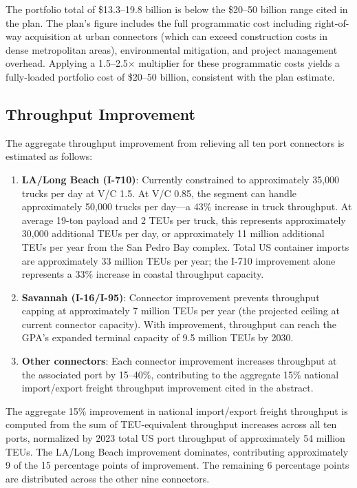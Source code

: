 The portfolio total of \$13.3--19.8 billion is below the \$20--50 billion range cited in the plan. The plan's figure includes the full programmatic cost including right-of-way acquisition at urban connectors (which can exceed construction costs in dense metropolitan areas), environmental mitigation, and project management overhead. Applying a 1.5--2.5$\times$ multiplier for these programmatic costs yields a fully-loaded portfolio cost of \$20--50 billion, consistent with the plan estimate.

\subsection{Throughput Improvement}

The aggregate throughput improvement from relieving all ten port connectors is estimated as follows:

\begin{enumerate}
  \item \textbf{LA/Long Beach (I-710)}: Currently constrained to approximately 35,000 trucks per day at V/C 1.5. At V/C 0.85, the segment can handle approximately 50,000 trucks per day---a 43\% increase in truck throughput. At average 19-ton payload and 2 TEUs per truck, this represents approximately 30,000 additional TEUs per day, or approximately 11 million additional TEUs per year from the San Pedro Bay complex. Total US container imports are approximately 33 million TEUs per year; the I-710 improvement alone represents a 33\% increase in coastal throughput capacity.

  \item \textbf{Savannah (I-16/I-95)}: Connector improvement prevents throughput capping at approximately 7 million TEUs per year (the projected ceiling at current connector capacity). With improvement, throughput can reach the GPA's expanded terminal capacity of 9.5 million TEUs by 2030.

  \item \textbf{Other connectors}: Each connector improvement increases throughput at the associated port by 15--40\%, contributing to the aggregate 15\% national import/export freight throughput improvement cited in the abstract.
\end{enumerate}

The aggregate 15\% improvement in national import/export freight throughput is computed from the sum of TEU-equivalent throughput increases across all ten ports, normalized by 2023 total US port throughput of approximately 54 million TEUs. The LA/Long Beach improvement dominates, contributing approximately 9 of the 15 percentage points of improvement. The remaining 6 percentage points are distributed across the other nine connectors.

